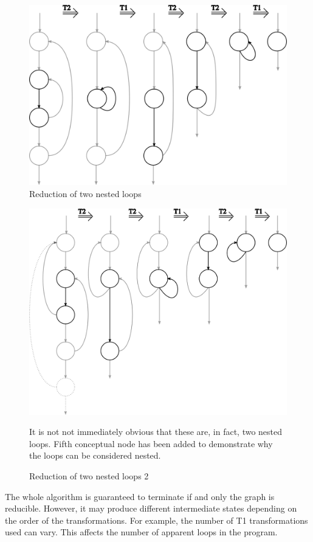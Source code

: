 \documentclass[12pt,twoside,notitlepage]{report}
\begin{document}
\begin{figure}[p]
\centerline{\includegraphics{figs/NestedLoops.png}}
\caption{\label{NestedLoops}Reduction of two nested loops}
\end{figure}

\begin{figure}[tbhp]
\centerline{\includegraphics{figs/NestedLoops2.png}}
It is not not immediately obvious that these are, in fact,
two nested loops.  Fifth conceptual node has been added
to demonstrate why the loops can be considered nested.
\caption{\label{NestedLoops2}Reduction of two nested loops 2}
\end{figure}

The whole algorithm is guaranteed to terminate if and only
the graph is reducible.  However, it may produce different 
intermediate states depending on the order of the transformations.
For example, the number of T1 transformations used can vary.
This affects the number of apparent loops in the program.
\end{document}
